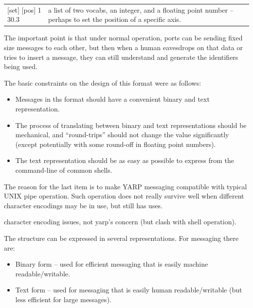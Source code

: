 \begin{tabular}{p{5cm}p{6cm}}
[set] [pos] 1 30.3 & a list of two vocabs, an integer, and a floating
point number -- perhaps to set the position of a specific axis.
\end{tabular}

The important point is that under normal operation, ports can be
sending fixed size messages to each other, but then when a human
eavesdrops on that data or tries to insert a message, they can still
understand and generate the identifiers being used.


The basic constraints on the design of this format were as follows:

\begin{itemize}

\item Messages in ths format should have a convenient binary and text
representation.

\item The process of translating between binary and text
representations should be mechanical, and ``round-trips'' should not
change the value significantly (except potentially with some round-off
in floating point numbers).

\item The text representation should be as easy as possible
to express from the command-line of common shells.

\end{itemize}

The reason for the last item is to make YARP messaging compatible
with typical UNIX pipe operation.  Such operation does not 
really survive well when different character encodings may be
in use, but still has uses.



character encoding issues, not yarp's concern (but clash with shell 
operation).


The structure
can be expressed in several representations.  For messaging there are:

\begin{itemize}

\item Binary form -- used for efficient messaging that is
easily machine readable/writable.

\item Text form -- used for messaging that is easily human
readable/writable (but less efficient for large messages).

\end{itemize}

